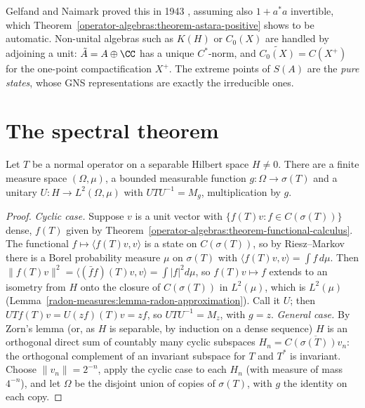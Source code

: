 \begin{remark}\label{operator-algebras:remark-gelfand-naimark}
Gelfand and Naimark proved this in 1943 \cite{gelfand-naimark-1943}, assuming also $1 + a^*a$ invertible, which Theorem~\ref{operator-algebras:theorem-astara-positive} shows to be automatic. Non-unital algebras such as $K(H)$ or
$C_0(X)$ are handled by adjoining a unit: $\tilde A = A \oplus \CC$ has a unique $C^*$-norm, and $\tilde{C_0(X)} = C(X^+)$ for the one-point compactification $X^+$. The extreme points of $S(A)$ are the \emph{pure states},
whose GNS representations are exactly the irreducible ones.
\end{remark}

\section{The spectral theorem}\label{operator-algebras:section-spectral-theorem}

\begin{theorem}\label{operator-algebras:theorem-spectral}
Let $T$ be a normal operator on a separable Hilbert space $H \neq 0$. There are a finite measure space $(\Omega, \mu)$, a bounded measurable function $g \colon \Omega \to \sigma(T)$ and a unitary $U \colon H \to L^2(\Omega, \mu)$
with $UTU^{-1} = M_g$, multiplication by $g$.
\end{theorem}

\begin{proof}
\emph{Cyclic case.} Suppose $v$ is a unit vector with $\{f(T)v : f \in C(\sigma(T))\}$ dense, $f(T)$ given by Theorem~\ref{operator-algebras:theorem-functional-calculus}. The functional $f \mapsto \langle f(T)v, v\rangle$ is a state on
$C(\sigma(T))$, so by Riesz--Markov there is a Borel probability measure $\mu$ on $\sigma(T)$ with $\langle f(T)v, v\rangle = \int f\,d\mu$. Then $\|f(T)v\|^2 = \langle(\bar ff)(T)v, v\rangle = \int|f|^2d\mu$, so $f(T)v \mapsto f$ extends to
an isometry from $H$ onto the closure of $C(\sigma(T))$ in $L^2(\mu)$, which is $L^2(\mu)$ (Lemma~\ref{radon-measures:lemma-radon-approximation}). Call it $U$; then $UTf(T)v = U(zf)(T)v = zf$, so $UTU^{-1} = M_z$, with $g = z$.
\emph{General case.} By Zorn's lemma (or, as $H$ is separable, by induction on a dense sequence) $H$ is an orthogonal direct sum of countably many cyclic subspaces $H_n = \overline{C(\sigma(T))v_n}$: the orthogonal complement of
an invariant subspace for $T$ and $T^*$ is invariant. Choose $\|v_n\| = 2^{-n}$, apply the cyclic case to each $H_n$ (with measure of mass $4^{-n}$), and let $\Omega$ be the disjoint union of copies of $\sigma(T)$, with $g$ the
identity on each copy.
\end{proof}

